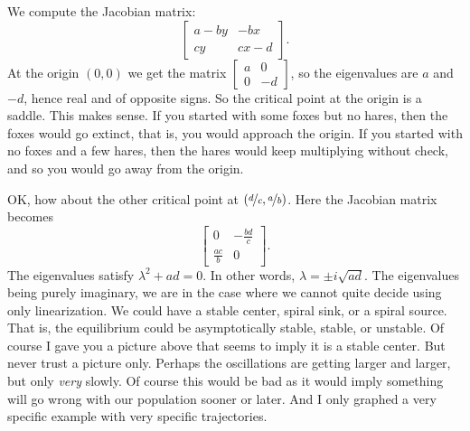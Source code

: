We compute the Jacobian matrix:
\begin{equation*}
\begin{bmatrix}
a-by & -bx \\
cy & cx-d
\end{bmatrix} .
\end{equation*}
At the origin $(0,0)$ we get the matrix
$\left[ \begin{smallmatrix}
a & 0 \\
0 & -d
\end{smallmatrix} \right]$, so the eigenvalues are $a$ and $-d$, hence real
and of opposite signs.  So the critical point at the origin is a saddle.
This makes sense.  If you started with some foxes but no hares, then the
foxes would go extinct, that is, you would approach the origin.  If you
started with no foxes and a few hares, then the hares would keep multiplying
without check, and so you would go away from the origin.

OK\@, how about the other critical point at $(\nicefrac{d}{c},\nicefrac{a}{b})$.  Here
the Jacobian matrix becomes
\begin{equation*}
\begin{bmatrix}
0 & -\frac{bd}{c} \\
\frac{ac}{b} & 0
\end{bmatrix} .
\end{equation*}
The eigenvalues satisfy $\lambda^2 + ad = 0$.  In
other words, $\lambda = \pm i \sqrt{ad}$.  The eigenvalues being
purely imaginary, we are in the case where we cannot quite decide using only
linearization.  We could
have a stable center, spiral sink, or a spiral source.  That is, the
equilibrium could be asymptotically stable, stable, or unstable.  Of
course I gave you a picture above that seems to imply it is a stable
center.  But never trust a picture only.  Perhaps the oscillations
are getting larger and larger, but only \emph{very} slowly.  Of course this would be
bad as it would imply something will go wrong with our population
sooner or later.  And I only graphed a very specific example with very
specific trajectories.

